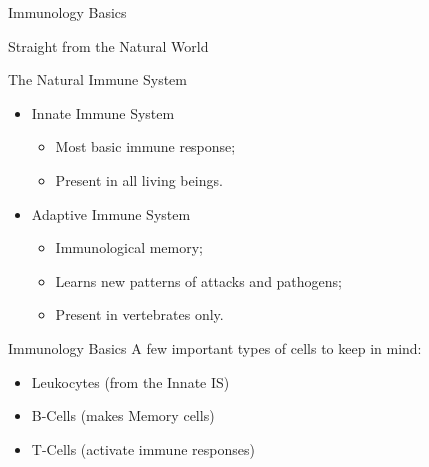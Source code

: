 \documentclass[xcolor=svgnames]{beamer}
\newcommand{\introframe}[2]{
    \begin{frame}
	   \vfill
	   \hfill\Huge{#1}
	   
	   \vspace{1em}
	   
	   \hfill\Large{#2}
	   \vfill
    \end{frame}
}
\begin{document}
	\introframe{Immunology Basics}{Straight from the Natural World}
	
        \begin{frame}{The Natural Immune System}        
            \begin{itemize}
                \item Innate Immune System
                \begin{itemize}
                    \item Most basic immune response;
                    \item Present in all living beings.
                \end{itemize}
                \item Adaptive Immune System
                \begin{itemize}
                    \item Immunological memory;
                    \item Learns new patterns of attacks and pathogens;
                    \item Present in vertebrates only.
                \end{itemize}
            \end{itemize}
	    \end{frame}
        
        \begin{frame}{Immunology Basics}
            A few important types of cells to keep in mind:
            \vspace{1em}
        	\begin{itemize}
        	    \item Leukocytes (from the Innate IS)
                \item B-Cells (makes Memory cells)
            	\item T-Cells (activate immune responses)
         	\end{itemize}
    	\end{frame}
\end{document}
